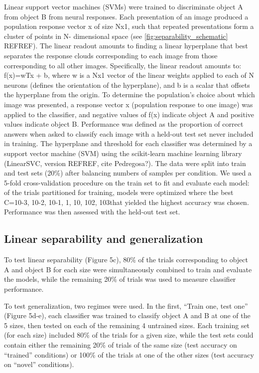 Linear support vector machines (SVMs) were trained to discriminate object A from object B from neural responses. Each presentation of an image produced a population response vector x of size Nx1, such that repeated presentations form a cluster of points in N- dimensional space (see \ref{fig:separability_schematic} REFREF). The linear readout amounts to finding a linear hyperplane that best separates the response clouds corresponding to each image from those corresponding to all other images. Specifically, the linear readout amounts to: f(x)=wTx + b, where w is a Nx1 vector of the linear weights applied to each of N neurons (defines the orientation of the hyperplane), and b is a scalar that offsets the hyperplane from the origin. To determine the population’s choice about which image was presented, a response vector x (population response to one image) was applied to the classifier, and negative values of f(x) indicate object A and positive values indicate object B. Performance was defined as the proportion of correct answers when asked to classify each image with a held-out test set never included in training. 
The hyperplane and threshold for each classifier was determined by a support vector machine (SVM) using the scikit-learn machine learning library (LinearSVC, version REFREF, cite Pedregosa?). The data were split into train and test sets (20\%) after balancing numbers of samples per condition. We used a 5-fold cross-validation procedure on the train set to fit and evaluate each model:  of the trials partitioned for training, models were optimized where the best C={10-3, 10-2, 10-1, 1, 10, 102, 103}that yielded the highest accuracy was chosen. Performance was then assessed with the held-out test set. 

\subsection{Linear separability and generalization}
To test linear separability (Figure 5c), 80\% of the trials corresponding to object A and object B for each size were simultaneously combined to train and evaluate the models, while the remaining 20\% of trials was used to measure classifier performance. 

To test generalization, two regimes were used. In the first, “Train one, test one” (Figure 5d-e), each classifier was trained to classify object A and B at one of the 5 sizes, then tested on each of the remaining 4 untrained sizes. Each training set (for each size) included 80\% of the trials for a given size, while the test sets could contain either the remaining 20\% of trials of the same size (test accuracy on “trained” conditions) or 100\% of the trials at one of the other sizes (test accuracy on “novel” conditions). 


